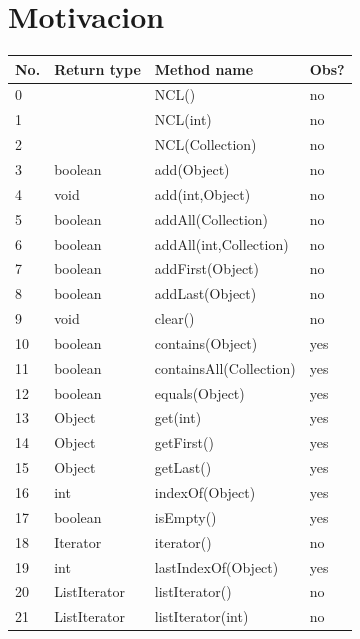 

\section{Motivacion}
\label{sec:motivacion}
\begin{table}[H]
\center
{\scriptsize
\begin{tabular}{|l|l|l|l|}
\hline
No. &Return type & Method name & Obs? \\
\hline
    0 && NCL() & no \\
    1& & NCL(int) & no \\
    2&& NCL(Collection) & no \\
    3&boolean & add(Object) & no \\
    4&void&add(int,Object) & no \\
    5&boolean&addAll(Collection) & no\\
    6&boolean&addAll(int,Collection) & no \\
    7&boolean&addFirst(Object) & no \\
    8&boolean&addLast(Object) & no\\
    9&void&clear() & no\\
    10&boolean&contains(Object) & yes \\
    11&boolean&containsAll(Collection) & yes \\
    12&boolean&equals(Object) & yes \\
    13&Object&get(int) & yes\\
    14&Object&getFirst() &yes \\
    15&Object&getLast() & yes\\
    16&int&indexOf(Object) &yes\\
    17&boolean&isEmpty() & yes\\
    18&Iterator&iterator() & no\\
    19&int&lastIndexOf(Object) &yes \\
    20&ListIterator&listIterator() &no \\
    21&ListIterator&listIterator(int) & no\\

\end{tabular}}
\end{table}
